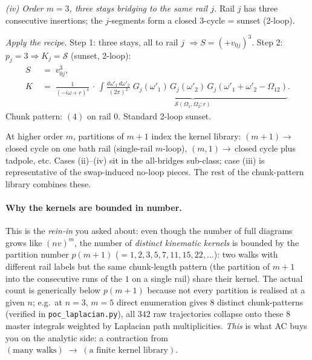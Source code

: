 \documentclass[11pt,a4paper]{article}
\begin{document}
\medskip
\textit{(iv) Order $m{=}3$, three stays bridging to the same rail $j$.}
Rail $j$ has three consecutive insertions; the $j$-segments form a closed
$3$-cycle = sunset (2-loop).
\begin{center}
\end{center}
\textit{Apply the recipe.}
\;Step 1: three stays, all to rail $j$
$\Rightarrow S = (+v_{0j})^{3}$.
\;Step 2: $p_{j}{=}3 \Rightarrow K_{j}=\mathcal S$ (sunset, 2-loop):
\begin{align*}
S \;&=\; v_{0j}^{3},\\
K \;&=\; \frac{1}{(-i\omega+r)^{4}}\,\cdot\,
\underbrace{\int\!\frac{d\omega'_{1}\,d\omega'_{2}}{(2\pi)^{2}}\;
G_{j}(\omega'_{1})\,G_{j}(\omega'_{2})\,G_{j}(\omega'_{1}{+}\omega'_{2}{-}\Omega_{12})}_{\mathcal S(\Omega_{1},\Omega_{2};r)}.
\end{align*}
Chunk pattern: $(4)$ on rail $0$. Standard 2-loop sunset.

\medskip
At higher order $m$, partitions of $m{+}1$ index the kernel library:
$(m{+}1)\!\to\!$\,closed cycle on one bath rail (single-rail $m$-loop),
$(m,1)\!\to\!$\,closed cycle plus tadpole, etc. Cases (ii)--(iv) sit in
the all-bridges sub-class; case (iii) is representative of the
swap-induced no-loop pieces. The rest of the chunk-pattern library
combines these.

\paragraph{Why the kernels are bounded in number.}
This is the \emph{rein-in} you asked about: even though the number of full
diagrams grows like $(nv)^{m}$, the number of \emph{distinct kinematic
kernels} is bounded by the partition number $p(m{+}1)$
($\!=\!1,2,3,5,7,11,15,22,\dots$): two walks with different rail labels but
the same chunk-length pattern (the partition of $m{+}1$ into the consecutive
runs of the $1$ on a single rail) share their kernel. The actual count is
generically below $p(m{+}1)$ because not every partition is realised at a
given $n$; e.g.\ at $n{=}3,\,m{=}5$ direct enumeration gives $8$ distinct
chunk-patterns (verified in \texttt{poc\_laplacian.py}), all $342$ raw
trajectories collapse onto these $8$ master integrals weighted by Laplacian
path multiplicities. \emph{This} is what AC buys you on the analytic side: a
contraction from $(\text{many walks})\;\to\;(\text{a finite kernel library})$.
\end{document}
